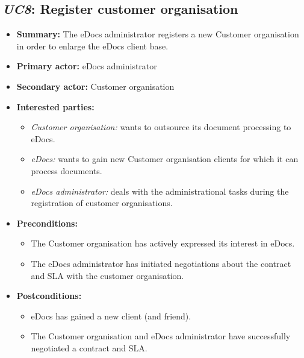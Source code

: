 \documentclass[a4paper,10pt]{article}
\begin{document}
\subsection{\emph{UC8}: Register customer organisation}
\label{usecase:registercustomerorg}
\begin{itemize}
    \item \textbf{Summary:} The eDocs administrator registers a new Customer organisation in order to enlarge the eDocs client base.
    \item \textbf{Primary actor:} eDocs administrator
    \item \textbf{Secondary actor:} Customer organisation
    \item \textbf{Interested parties:} 
        \begin{itemize}
            \item \textit{Customer organisation:} wants to outsource its document processing to eDocs.
            \item \textit{eDocs:} wants to gain new Customer organisation clients for which it can process documents.
            \item \textit{eDocs administrator:} deals with the administrational tasks during the registration of customer organisations.
        \end{itemize}
    \item \textbf{Preconditions:}
        \begin{itemize}
            \item The Customer organisation has actively expressed its interest in eDocs.
            \item The eDocs administrator has initiated negotiations about the contract and SLA with the customer organisation.
        \end{itemize}
    \item \textbf{Postconditions:}
        \begin{itemize}
            \item eDocs has gained a new client (and friend).
            \item The Customer organisation and eDocs administrator have successfully negotiated a contract and SLA.
        \end{itemize}
        

\end{itemize}
\end{document}

